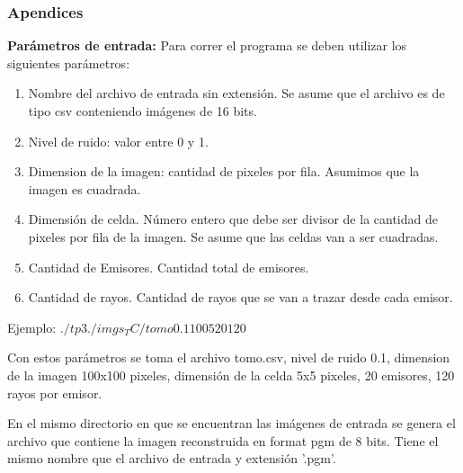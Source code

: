 \subsubsection*{Apendices}

\textbf{Parámetros de entrada:} Para correr el programa se deben utilizar los siguientes parámetros:
\begin{enumerate}
\item Nombre del archivo de entrada sin extensión. Se asume que el archivo es de tipo csv conteniendo imágenes de 16 bits.
\item Nivel de ruido: valor entre 0 y 1.
\item Dimension de la imagen: cantidad de pixeles por fila. Asumimos que la imagen es cuadrada.
\item Dimensión de celda. Número entero que debe ser divisor de la cantidad de pixeles por fila de la imagen. Se asume que las celdas van a ser cuadradas.
\item Cantidad de Emisores. Cantidad total de emisores.
\item Cantidad de rayos. Cantidad de rayos que se van a trazar desde cada emisor.
\end{enumerate}
\par Ejemplo: $./tp3 ./imgs_TC/tomo 0.1 100 5 20 120$
\par Con estos parámetros se toma el archivo tomo.csv, nivel de ruido 0.1, dimension de la imagen 100x100 pixeles, dimensión de la celda 5x5 pixeles, 20 emisores, 120 rayos por emisor.

\par En el mismo directorio en que se encuentran las imágenes de entrada se genera el archivo que contiene la imagen reconstruida en format pgm de 8 bits. Tiene el mismo nombre que el archivo de entrada y extensión '.pgm'.



